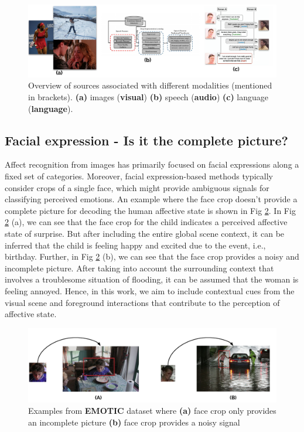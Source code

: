 \begin{figure}[h!]
    \centering
    \includegraphics[width=\textwidth]{figures/emotion_overview.pdf}
    \caption{Overview of sources associated with different modalities (mentioned in brackets). \textbf{(a)} images (\textbf{visual}) \textbf{(b)} speech (\textbf{audio}) \textbf{(c)} language (\textbf{language}).}
    \label{emotion overview}
\end{figure}

\subsection{Facial expression - Is it the complete picture?}
Affect recognition from images has primarily focused on facial expressions \cite{DFEW,Mollahosseini2019AffectNetAD} along a fixed set of categories. Moreover, facial expression-based methods typically consider crops of a single face, which might provide ambiguous signals for classifying perceived emotions. An example where the face crop doesn't provide a complete picture for decoding the human affective state is shown in Fig \ref{face crop}. In Fig \ref{face crop} (a), we can see that the face crop for the child indicates a perceived affective state of surprise. But after including the entire global scene context, it can be inferred that the child is feeling happy and excited due to the event, i.e., birthday.
Further, in Fig \ref{face crop} (b), we can see that the face crop provides a noisy and incomplete picture. After taking into account the surrounding context that involves a troublesome situation of flooding, it can be assumed that the woman is feeling annoyed. Hence, in this work, we aim to include contextual cues from the visual scene and foreground interactions that contribute to the perception of affective state.

\begin{figure}[h!]
    \centering
    \includegraphics[width=\textwidth]{figures/face_crop_drawings.pdf}
    \caption{Examples from \textbf{EMOTIC} dataset where \textbf{(a)} face crop only provides an incomplete picture \textbf{(b)} face crop provides a noisy signal }
    \label{face crop}
\end{figure}
